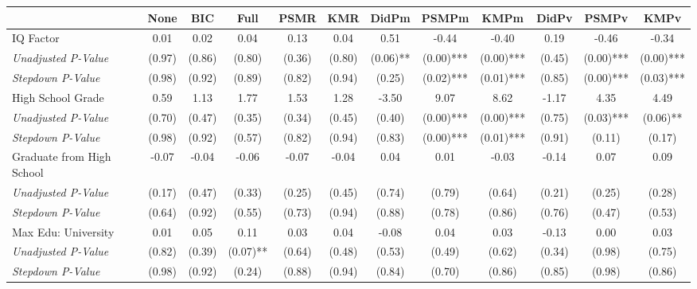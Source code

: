 \begin{tabular}{l c c c c c c c c c c c}
\toprule
 & None & BIC & Full & PSMR & KMR & DidPm & PSMPm & KMPm & DidPv & PSMPv & KMPv \\
\midrule
IQ Factor & 0.01 & 0.02 & 0.04 & 0.13 & 0.04 & 0.51 & -0.44 & -0.40 & 0.19 & -0.46 & -0.34 \\
\quad \textit{Unadjusted P-Value} & (0.97) & (0.86) & (0.80) & (0.36) & (0.80) & (0.06)** & (0.00)*** & (0.00)*** & (0.45) & (0.00)*** & (0.00)*** \\
\quad \textit{Stepdown P-Value} & (0.98) & (0.92) & (0.89) & (0.82) & (0.94) & (0.25) & (0.02)*** & (0.01)*** & (0.85) & (0.00)*** & (0.03)*** \\
High School Grade & 0.59 & 1.13 & 1.77 & 1.53 & 1.28 & -3.50 & 9.07 & 8.62 & -1.17 & 4.35 & 4.49 \\
\quad \textit{Unadjusted P-Value} & (0.70) & (0.47) & (0.35) & (0.34) & (0.45) & (0.40) & (0.00)*** & (0.00)*** & (0.75) & (0.03)*** & (0.06)** \\
\quad \textit{Stepdown P-Value} & (0.98) & (0.92) & (0.57) & (0.82) & (0.94) & (0.83) & (0.00)*** & (0.01)*** & (0.91) & (0.11) & (0.17) \\
Graduate from High School & -0.07 & -0.04 & -0.06 & -0.07 & -0.04 & 0.04 & 0.01 & -0.03 & -0.14 & 0.07 & 0.09 \\
\quad \textit{Unadjusted P-Value} & (0.17) & (0.47) & (0.33) & (0.25) & (0.45) & (0.74) & (0.79) & (0.64) & (0.21) & (0.25) & (0.28) \\
\quad \textit{Stepdown P-Value} & (0.64) & (0.92) & (0.55) & (0.73) & (0.94) & (0.88) & (0.78) & (0.86) & (0.76) & (0.47) & (0.53) \\
Max Edu: University & 0.01 & 0.05 & 0.11 & 0.03 & 0.04 & -0.08 & 0.04 & 0.03 & -0.13 & 0.00 & 0.03 \\
\quad \textit{Unadjusted P-Value} & (0.82) & (0.39) & (0.07)** & (0.64) & (0.48) & (0.53) & (0.49) & (0.62) & (0.34) & (0.98) & (0.75) \\
\quad \textit{Stepdown P-Value} & (0.98) & (0.92) & (0.24) & (0.88) & (0.94) & (0.84) & (0.70) & (0.86) & (0.85) & (0.98) & (0.86) \\
\bottomrule
\end{tabular}
